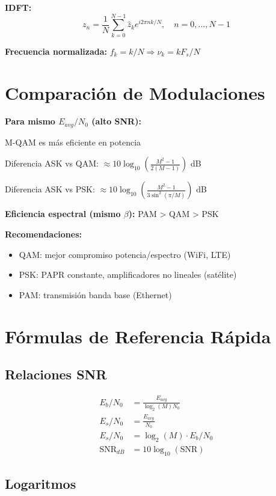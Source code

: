 \documentclass[10pt,a4paper]{article}
\begin{document}
\textbf{IDFT:}
$$z_n = \frac{1}{N}\sum_{k=0}^{N-1} \hat{z}_k e^{i2\pi nk/N}, \quad n = 0,\ldots,N-1$$

\textbf{Frecuencia normalizada:} $f_k = k/N \Rightarrow \nu_k = kF_s/N$

\section{Comparación de Modulaciones}

\begin{tcolorbox}[colback=azulclaro!10,colframe=azuloscuro,title=Resumen comparativo]
\textbf{Para mismo $E_{avg}/N_0$ (alto SNR):}

M-QAM es más eficiente en potencia

Diferencia ASK vs QAM: $\approx 10\log_{10}\left(\frac{M^2-1}{2(M-1)}\right)$ dB

Diferencia ASK vs PSK: $\approx 10\log_{10}\left(\frac{M^2-1}{3\sin^2(\pi/M)}\right)$ dB

\textbf{Eficiencia espectral (mismo $\beta$):} PAM > QAM > PSK

\textbf{Recomendaciones:}
\begin{itemize}
\item QAM: mejor compromiso potencia/espectro (WiFi, LTE)
\item PSK: PAPR constante, amplificadores no lineales (satélite)
\item PAM: transmisión banda base (Ethernet)
\end{itemize}
\end{tcolorbox}

\section{Fórmulas de Referencia Rápida}

\subsection{Relaciones SNR}

\begin{align*}
E_b/N_0 &= \frac{E_{avg}}{\log_2(M)N_0}\\
E_s/N_0 &= \frac{E_{avg}}{N_0}\\
E_s/N_0 &= \log_2(M) \cdot E_b/N_0\\
\text{SNR}_{dB} &= 10\log_{10}(\text{SNR})
\end{align*}

\subsection{Logaritmos}
\end{document}
